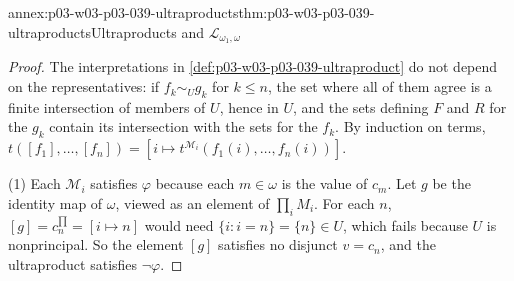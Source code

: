 \begin{annexitem}{annex:p03-w03-p03-039-ultraproducts}{thm:p03-w03-p03-039-ultraproducts}{Ultraproducts and \(\mathcal L_{\omega_1,\omega}\)}
\begin{proof}
The interpretations in \cref{def:p03-w03-p03-039-ultraproduct} do not depend
on the representatives: if \(f_k\sim_Ug_k\) for \(k\le n\), the set where all
of them agree is a finite intersection of members of \(U\), hence in \(U\),
and the sets defining \(F\) and \(R\) for the \(g_k\) contain its
intersection with the sets for the \(f_k\). By induction on terms,
\(t([f_1],\dots,[f_n])=[i\mapsto t^{\mathcal M_i}(f_1(i),\dots,f_n(i))]\).

(1) Each \(\mathcal M_i\) satisfies \(\varphi\) because each \(m\in\omega\) is
the value of \(c_m\). Let \(g\) be the identity map of \(\omega\), viewed as
an element of \(\prod_i M_i\). For each \(n\),
\([g]=c_n^{\prod}=[i\mapsto n]\) would need \(\{i:i=n\}=\{n\}\in U\), which
fails because \(U\) is nonprincipal. So the element \([g]\) satisfies no
disjunct \(v=c_n\), and the ultraproduct satisfies \(\neg\varphi\).


\end{proof}
\end{annexitem}
